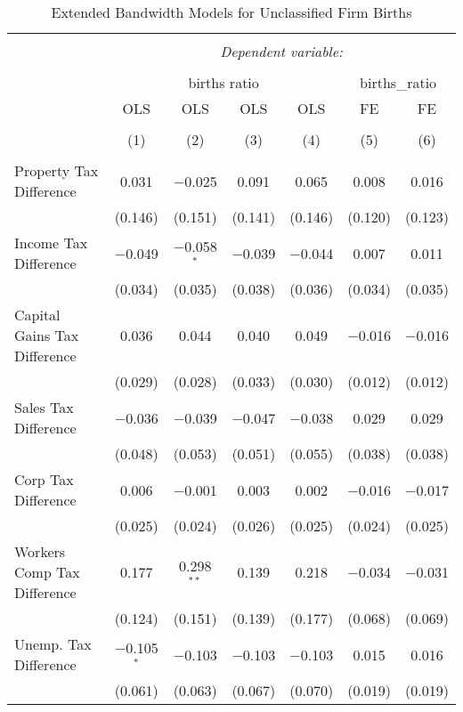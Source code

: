 
\begin{table}[!htbp] \centering 
  \caption{Extended Bandwidth Models for  Unclassified Firm Births} 
  \label{99eb} 
\begin{tabular}{@{\extracolsep{5pt}}lcccccc} 
\\[-1.8ex]\hline 
\hline \\[-1.8ex] 
 & \multicolumn{6}{c}{\textit{Dependent variable:}} \\ 
\cline{2-7} 
\\[-1.8ex] & \multicolumn{4}{c}{births ratio} & \multicolumn{2}{c}{births\_ratio} \\ 
 & OLS & OLS & OLS & OLS & FE & FE \\ 
\\[-1.8ex] & (1) & (2) & (3) & (4) & (5) & (6)\\ 
\hline \\[-1.8ex] 
 Property Tax Difference & 0.031 & $-$0.025 & 0.091 & 0.065 & 0.008 & 0.016 \\ 
  & (0.146) & (0.151) & (0.141) & (0.146) & (0.120) & (0.123) \\ 
  Income Tax Difference & $-$0.049 & $-$0.058$^{*}$ & $-$0.039 & $-$0.044 & 0.007 & 0.011 \\ 
  & (0.034) & (0.035) & (0.038) & (0.036) & (0.034) & (0.035) \\ 
  Capital Gains Tax Difference & 0.036 & 0.044 & 0.040 & 0.049 & $-$0.016 & $-$0.016 \\ 
  & (0.029) & (0.028) & (0.033) & (0.030) & (0.012) & (0.012) \\ 
  Sales Tax Difference & $-$0.036 & $-$0.039 & $-$0.047 & $-$0.038 & 0.029 & 0.029 \\ 
  & (0.048) & (0.053) & (0.051) & (0.055) & (0.038) & (0.038) \\ 
  Corp Tax Difference & 0.006 & $-$0.001 & 0.003 & 0.002 & $-$0.016 & $-$0.017 \\ 
  & (0.025) & (0.024) & (0.026) & (0.025) & (0.024) & (0.025) \\ 
  Workers Comp Tax Difference & 0.177 & 0.298$^{**}$ & 0.139 & 0.218 & $-$0.034 & $-$0.031 \\ 
  & (0.124) & (0.151) & (0.139) & (0.177) & (0.068) & (0.069) \\ 
  Unemp. Tax Difference & $-$0.105$^{*}$ & $-$0.103 & $-$0.103 & $-$0.103 & 0.015 & 0.016 \\ 
  & (0.061) & (0.063) & (0.067) & (0.070) & (0.019) & (0.019) \\ 

\end{tabular}
\end{table}
